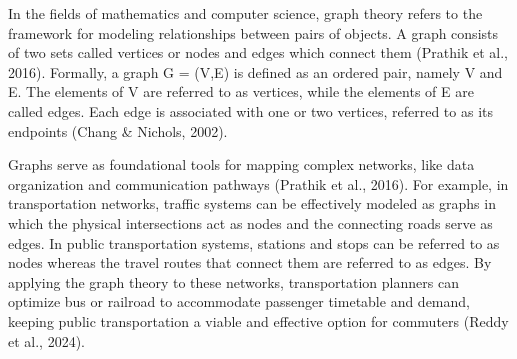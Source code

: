 In the fields of mathematics and computer science, graph theory refers to the framework for modeling relationships between pairs of objects. A graph consists of two sets called vertices or nodes and edges which connect them (Prathik et al., 2016). Formally, a graph G = (V,E) is defined as an ordered pair, namely V and E. The elements of V are referred to as vertices, while the elements of E are called edges. Each edge is associated with one or two vertices, referred to as its endpoints (Chang \& Nichols, 2002). 

Graphs serve as foundational tools for mapping complex networks, like data organization and communication pathways (Prathik et al., 2016). For example, in transportation networks, traffic systems can be effectively modeled as graphs in which the physical intersections act as nodes and the connecting roads serve as edges. In public transportation systems, stations and stops can be referred to as nodes whereas the travel routes that connect them are referred to as edges. By applying the graph theory to these networks, transportation planners can optimize bus or railroad to accommodate passenger timetable and demand, keeping public transportation a viable and effective option for commuters (Reddy et al., 2024). 






